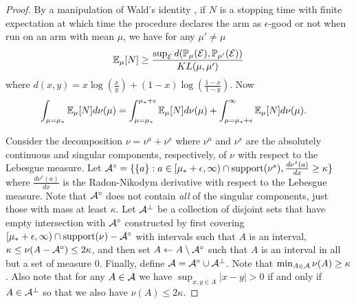 \begin{proof}
By a manipulation of Wald's identity \cite{WaldsLemma}, if $N$ is a stopping time with finite expectation at which time the procedure declares the arm as $\epsilon$-good or not when run on an arm with mean $\mu$, we have for any $\mu' \neq \mu$
\begin{align}
\mathbb{E}_\mu[N] \geq \frac{\sup_{\mathcal{E}} d( \mathbb{P}_\mu(\mathcal{E}), \mathbb{P}_{\mu'}(\mathcal{E}) )}{KL(\mu,\mu')} \label{eqn:wald}
\end{align}
where $d(x,y) = x \log(\frac{x}{y}) + (1-x) \log(\frac{1-x}{1-y})$.
Now
\begin{align*}
\int_{\mu=\mu_*} \mathbb{E}_\mu[N] d\nu(\mu) &= \int_{\mu=\mu_*}^{\mu_*+\epsilon} \mathbb{E}_\mu[N] d\nu(\mu) + \int_{\mu=\mu_*+\epsilon}^\infty \mathbb{E}_\mu[N] d\nu(\mu) .
\end{align*}


Consider the decomposition $\nu = \nu^a + \nu^s$ where $\nu^a$ and $\nu^s$ are the absolutely continuous and singular components, respectively, of $\nu$ with respect to the Lebesgue measure.
Let $\mathcal{A}^\circ = \{ \{a\} : a \in [\mu_* + \epsilon,\infty) \cap \mathrm{support}(\nu^s),  \frac{d\nu^s(a)}{dx} \geq \kappa \}$ where $\frac{d\nu^s(a)}{dx}$ is the Radon-Nikodym derivative with respect to the Lebesgue measure.
Note that $\mathcal{A}^\circ$ does not contain \emph{all} of the singular components, just those with mass at least $\kappa$.
Let $\mathcal{A}^\perp$ be a collection of disjoint sets that have empty intersection with $\mathcal{A}^\circ$ 
constructed by first covering $[\mu_* + \epsilon,\infty) \cap \mathrm{support}(\nu)-\mathcal{A}^\circ$ with intervals such that $A$ is an interval, $\kappa \leq \nu(A-\mathcal{A}^\circ) \leq 2 \kappa$, and then set $A \leftarrow A \setminus \mathcal{A}^\circ$ such that $A$ is an interval in all but a set of measure $0$.
Finally, define $\mathcal{A} = \mathcal{A}^\circ \cup \mathcal{A}^\perp$.
Note that $\min_{A \in \mathcal{A}} \nu(A) \geq \kappa$.
Also note that for any $A \in \mathcal{A}$ we have $\sup_{x,y \in A} |x-y| > 0$ if and only if $A \in \mathcal{A}^\perp$ so that we also have $\nu(A) \leq 2 \kappa$.  




\end{proof}
